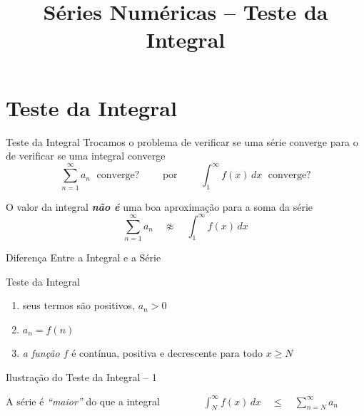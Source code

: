 \documentclass[fleqn,utf8,aspectratio=169,12pt]{beamer}
\title{Séries Numéricas -- Teste da Integral}
\begin{document}
\addtitle

\section{Teste da Integral}

\begin{frame}{Teste da Integral}
  Trocamos o problema de verificar se uma série converge para o de
  verificar se uma integral converge
  \[
    \sum_{n=1}^{\infty} a_n  \;\text{ converge?}
    \qquad \text{ por } \qquad
    \int_{1}^{\infty} f(x) \,dx  \;\text{ converge?}
  \]

  \pause
  O valor da integral \emph{\textbf{não é}} uma boa aproximação para a soma da série
  \[ \sum_{n=1}^{\infty} a_n  \quad \not\approx \quad \int_{1}^{\infty} f(x) \,dx\]
\end{frame}

\begin{frame}{Diferença Entre a Integral e a Série}
  \begin{center}
    
  \end{center}
\end{frame}

\begin{frame}[t]{Teste da Integral}
  \begin{enumerate}[<+->]
    \item seus termos são positivos, $a_n>0$
    \item $a_n=f(n)$
    \item \emph{a função $f$} é contínua, positiva e decrescente para todo $x \geq N$
  \end{enumerate}

	\bigskip

  \smallskip

  \medskip
\end{frame}

\begin{frame}{Ilustração do Teste da Integral -- 1}
  \begin{center}
    \scalebox{.9}{}
  \end{center}

  \pause
  A série é \emph{``maior''} do que a integral
  \pause
  \(
    \qquad\qquad
    \int_{N}^{\infty} f(x)\,dx
    \quad\leq\quad
    \sum_{n=N}^{\infty} a_n
  \)
\end{frame}
\end{document}
